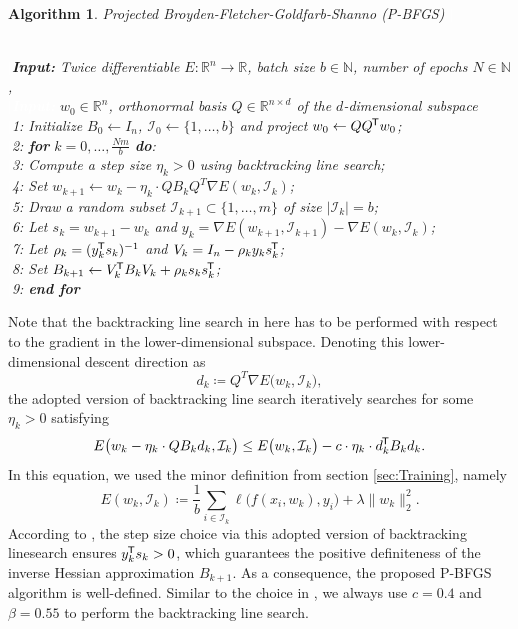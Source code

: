 \documentclass[11pt, a4paper]{article}
\newtheorem{algorithm}[theorem]{Algorithm}
\newcommand{\N}{\mathbb{N}}
\newcommand{\R}{\mathbb{R}}
\newcommand{\I}{\mathcal{I}}
\newcommand*{\tr}{^{\mkern-1.5mu\mathsf{T}}}
\begin{document}
\begin{algorithm}
\caption{Projected Broyden-Fletcher-Goldfarb-Shanno (P-BFGS) \textcolor{white}{$\Big |$}} \ \\
\textcolor{white}{$\Big |$}\textbf{Input:} Twice differentiable $E: \R^n \to \R$, batch size $b \in \N$, number of epochs $N \in \N$, \\
\textcolor{white}{$\Big |$\textbf{Input:}} $w_0 \in \R^n$, orthonormal basis $Q \in \R^{n \times d}$ of the $d$-dimensional subspace \\
\textcolor{white}{$\Big |$}1: Initialize $B_0 \leftarrow I_n$, $\I_0 \leftarrow \{ 1, \dots, b\}$ and project $w_0 \leftarrow QQ\tr w_0$; \\
\textcolor{white}{$\Big |$}2: \textbf{for} $k=0, \dots, \frac{Nm}{b}$ \textbf{do}: \\
\textcolor{white}{$\Big |$}3: \quad Compute a step size $\eta_k > 0$ using backtracking line search; \\
\textcolor{white}{$\Big |$}4: \quad Set $w_{k+1} \leftarrow w_k - \eta_k \cdot Q B_k Q^T \nabla E(w_k,\I_k)$; \\
\textcolor{white}{$\Big |$}5: \quad Draw a random subset $\I_{k+1} \subset \{1, \dots, m \}$ of size $| \I_k | = b$; \\
\textcolor{white}{$\Big |$}6: \quad Let $s_k = w_{k+1} - w_{k}$ and $y_k = \nabla E(w_{k+1}, \I_{k+1}) - \nabla E(w_{k}, \I_{k})$; \\
\textcolor{white}{$\Big |$}7: \quad Let $\rho_k = (y_k\tr s_k)^{-1}$ and $V_k = I_n - \rho_k y_k s_k\tr $; \\
\textcolor{white}{$\Big |$}8: \quad Set $B_{k+1} \leftarrow V_k\tr B_{k}V_k + \rho_k s_k s_k\tr $; \\
\textcolor{white}{$\Big |$}9: \textbf{end for}
\end{algorithm}

Note that the backtracking line search in here has to be performed with respect to the gradient in the lower-dimensional subspace. Denoting this lower-dimensional descent direction as
\[ d_k \coloneq Q^T \nabla E \big (w_k,\I_k \big), \] 
the adopted version of backtracking line search iteratively searches for some $\eta_k > 0$ satisfying 
\[ E \big (w_k - \eta_k \cdot Q B_k d_k, \I_k \big) \leq E \big (w_k, \I_k \big ) - c \cdot \eta_k \cdot d_k \tr B_k d_k. \]
In this equation, we used the minor definition from section \ref{sec:Training}, namely 
\[ E(w_k,\I_k) \coloneq \frac{1}{b} \sum_{i \in \I_k}^{}  \ell \big ( f(x_i,w_k),y_i \big) + \lambda \big \| w_k \big \|_2^2. \]
According to \cite{Paper}, the step size choice via this adopted version of backtracking linesearch ensures $y_k \tr s_k > 0$, which guarantees the positive definiteness of the inverse Hessian approximation $B_{k+1}$. As a consequence, the proposed P-BFGS algorithm is well-defined. Similar to the choice in \cite{Paper}, we always use $c = 0.4$ and $\beta = 0.55$ to perform the backtracking line search.
\end{document}
